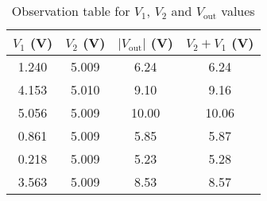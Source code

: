 \begin{table}[H]
    \centering
    \begin{tabular}{|c|c|c|c|} \hline
        $V_1$ (V)& $V_2$ (V) & $|V_\text{out}|$ (V) & $V_2+V_1$ (V) \\ \hline
        1.240& 5.009 & 6.24 & 6.24 \\
        4.153 & 5.010 & 9.10 & 9.16 \\
        5.056 & 5.009 & 10.00 & 10.06 \\
        0.861 & 5.009 & 5.85 & 5.87 \\
        0.218 & 5.009 & 5.23 & 5.28 \\
        3.563 & 5.009 & 8.53 & 8.57 \\
        \hline
        \end{tabular}    
        \caption{Observation table for $V_1$, $V_2$ and $V_\text{out}$ values}
        \label{tab:3}
\end{table}